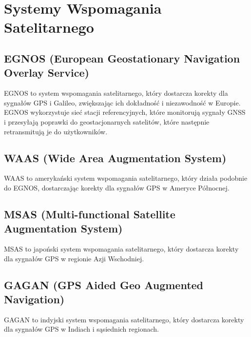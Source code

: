 \section{Systemy Wspomagania Satelitarnego}

\subsection{EGNOS (European Geostationary Navigation Overlay Service)}
EGNOS to system wspomagania satelitarnego, który dostarcza korekty dla sygnałów GPS i Galileo, zwiększając ich dokładność i niezawodność w Europie. EGNOS wykorzystuje sieć stacji referencyjnych, które monitorują sygnały GNSS i przesyłają poprawki do geostacjonarnych satelitów, które następnie retransmitują je do użytkowników.

\subsection{WAAS (Wide Area Augmentation System)}
WAAS to amerykański system wspomagania satelitarnego, który działa podobnie do EGNOS, dostarczając korekty dla sygnałów GPS w Ameryce Północnej.

\subsection{MSAS (Multi-functional Satellite Augmentation System)}
MSAS to japoński system wspomagania satelitarnego, który dostarcza korekty dla sygnałów GPS w regionie Azji Wschodniej.

\subsection{GAGAN (GPS Aided Geo Augmented Navigation)}
GAGAN to indyjski system wspomagania satelitarnego, który dostarcza korekty dla sygnałów GPS w Indiach i sąsiednich regionach.
